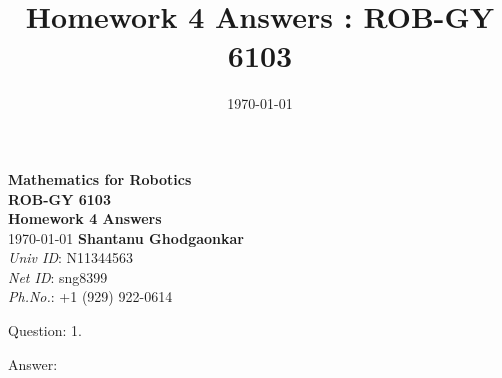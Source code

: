 \documentclass[a4paper]{article}
\title{Homework 4 Answers : ROB-GY 6103}
\author{\myName}
\date{\today}
\newcommand{\myName}{\textbf{Shantanu Ghodgaonkar}\\\textit{Univ ID}: N11344563\\\textit{Net ID}: sng8399\\\textit{Ph.No.}: +1 (929) 922-0614}
\begin{document}
	
	\begin{titlepage}
	    \centering
	    \vspace{2cm}
	    \Huge\textbf{Mathematics for Robotics \\ ROB-GY 6103 \\ Homework 4 Answers}
	    \vspace{1cm}
	    \\ \Large \today
	    \vfill
	    \Large \myName
	\end{titlepage}
	
	\begin{qalist}			
		\item[Question: 1.] \setcounter{equation}{0}
		\item[Answer:] 
			
	\end{qalist}
\end{document}
